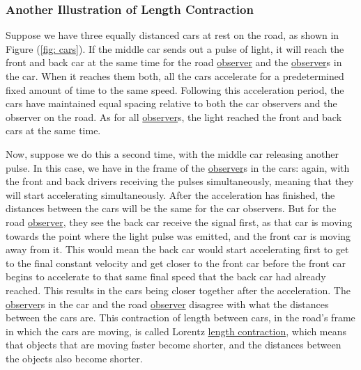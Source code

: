 \subsubsection{Another Illustration of Length Contraction}

Suppose we have three equally distanced cars at rest on the road, as shown in Figure (\ref{fig: cars}).
If the middle car sends out a pulse of light, it will reach the front and back car at the same time for the road \hyperlink{def-observer}{observer} and the \hyperlink{def-observer}{observer}s in the car. When it reaches them both, all the cars accelerate for a predetermined fixed amount of time to the same speed.
Following this acceleration period, the cars have maintained equal spacing relative to both the car observers and the observer on the road.
As for all \hyperlink{def-observer}{observer}s, the light reached the front and back cars at the same time.

Now, suppose we do this a second time, with the middle car releasing another pulse.
In this case, we have in the frame of the \hyperlink{def-observer}{observer}s in the cars: again, with the front and back drivers receiving the pulses simultaneously, meaning that they will start accelerating simultaneously.
After the acceleration has finished, the distances between the cars will be the same for the car observers.
But for the road \hyperlink{def-observer}{observer}, they see the back car receive the signal first, as that car is moving towards the point where the light pulse was emitted, and the front car is moving away from it.
This would mean the back car would start accelerating first to get to the final constant velocity and get closer to the front car before the front car begins to accelerate to that same final speed that the back car had already reached.
This results in the cars being closer together after the acceleration.
The \hyperlink{def-observer}{observer}s in the car and the road \hyperlink{def-observer}{observer} disagree with what the distances between the cars are.
This contraction of length between cars, in the road's frame in which the cars are moving, is called Lorentz \hyperlink{def-length-contraction}{length contraction}, which means that objects that are moving faster become shorter, and the distances between the objects also become shorter.

